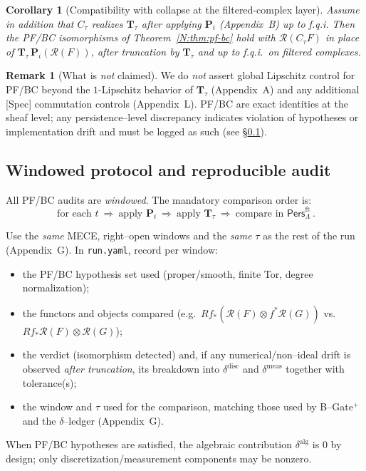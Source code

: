 \documentclass[11pt]{article}
\newcommand{\Pers}{\mathsf{Pers}}
\numberwithin{equation}{section}
\newtheorem{corollary}[theorem]{Corollary}
\theoremstyle{definition}
\newtheorem{remark}[theorem]{Remark}
\begin{document}
\begin{corollary}[Compatibility with collapse at the filtered-complex layer]
Assume in addition that \(C_\tau\) realizes \(\mathbf{T}_\tau\) after applying \(\mathbf{P}_i\) (Appendix~B) up to f.q.i.
Then the PF/BC isomorphisms of Theorem~\ref{N:thm:pf-bc} hold with \(\mathcal{R}(C_\tau F)\) in place of \(\mathbf{T}_\tau\,\mathbf{P}_i(\mathcal{R}(F))\), \emph{after truncation by \(\mathbf{T}_\tau\) and up to f.q.i.\ on filtered complexes}.
\end{corollary}

\begin{remark}[What is \emph{not} claimed]
We do \emph{not} assert global Lipschitz control for PF/BC beyond the \(1\)\nobreakdash-Lipschitz behavior of \(\mathbf{T}_\tau\) (Appendix~A) and any additional [Spec] commutation controls (Appendix~L). PF/BC are exact identities at the sheaf level; any persistence--level discrepancy indicates violation of hypotheses or implementation drift and must be logged as such (see \S\ref{N:window-protocol}).
\end{remark}

\subsection{Windowed protocol and reproducible audit}
\label{N:window-protocol}
All PF/BC audits are \emph{windowed}. The mandatory comparison order is:
\begin{equation*}
\boxed{\ \text{for each } t\ \Longrightarrow\ \text{apply } \mathbf{P}_i\ \Longrightarrow\ \text{apply } \mathbf{T}_\tau\ \Longrightarrow\ \text{compare in }\Pers^{\mathrm{ft}}_\Lambda\ }.
\end{equation*}

Use the \emph{same} MECE, right–open windows and the \emph{same} \(\tau\) as the rest of the run (Appendix~G). In \texttt{run.yaml}, record per window:
\begin{itemize}\itemsep0.25em
  \item the PF/BC hypothesis set used (proper/smooth, finite Tor, degree normalization);
  \item the functors and objects compared (e.g.\ \(Rf_\ast(\mathcal{R}(F)\otimes f^\ast\mathcal{R}(G))\) vs.\ \(Rf_\ast\mathcal{R}(F)\otimes\mathcal{R}(G)\));
  \item the verdict (isomorphism detected) and, if any numerical/non–ideal drift is observed \emph{after truncation}, its breakdown into \(\delta^{\mathrm{disc}}\) and \(\delta^{\mathrm{meas}}\) together with tolerance(s);
  \item the window and \(\tau\) used for the comparison, matching those used by B–Gate\(^{+}\) and the \(\delta\)–ledger (Appendix~G).
\end{itemize}
When PF/BC hypotheses are satisfied, the algebraic contribution \(\delta^{\mathrm{alg}}\) is \(0\) by design; only discretization/measurement components may be nonzero.
\end{document}
